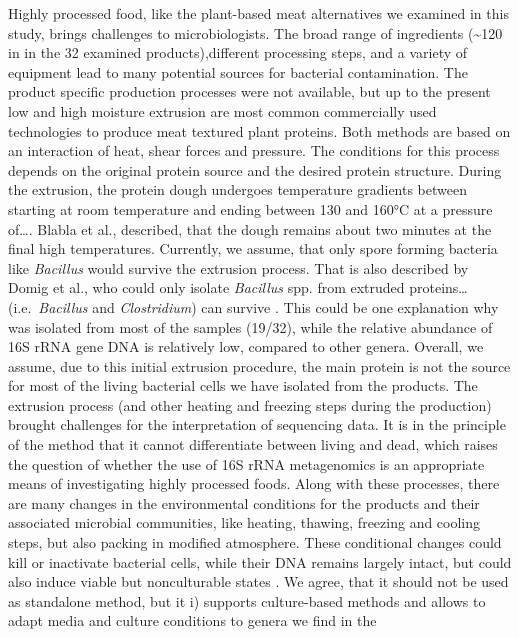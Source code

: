 \documentclass[preprint, 3p,
authoryear]{elsarticle} %
\begin{document}
Highly processed food, like the plant-based meat alternatives we
examined in this study, brings challenges to microbiologists. The broad
range of ingredients (\textasciitilde120 in in the 32 examined
products),different processing steps, and a variety of equipment lead to
many potential sources for bacterial contamination. The product specific
production processes were not available, but up to the present low and
high moisture extrusion are most common commercially used technologies
to produce meat textured plant proteins. Both methods are based on an
interaction of heat, shear forces and pressure. The conditions for this
process depends on the original protein source and the desired protein
structure. During the extrusion, the protein dough undergoes temperature
gradients between starting at room temperature and ending between 130
and 160°C at a pressure of\ldots. Blabla et al., described, that the
dough remains about two minutes at the final high temperatures.
Currently, we assume, that only spore forming bacteria like
\emph{Bacillus} would survive the extrusion process. That is also
described by Domig et al., who could only isolate \emph{Bacillus} spp.
from extruded proteins\ldots(i.e.~\emph{Bacillus} and
\emph{Clostridium}) can survive \citep{Leutgeb.2017}. This could be one
explanation why was isolated from most of the samples (19/32), while the
relative abundance of 16S rRNA gene DNA is relatively low, compared to
other genera. Overall, we assume, due to this initial extrusion
procedure, the main protein is not the source for most of the living
bacterial cells we have isolated from the products. The extrusion
process (and other heating and freezing steps during the production)
brought challenges for the interpretation of sequencing data. It is in
the principle of the method that it cannot differentiate between living
and dead, which raises the question of whether the use of 16S rRNA
metagenomics is an appropriate means of investigating highly processed
foods. Along with these processes, there are many changes in the
environmental conditions for the products and their associated microbial
communities, like heating, thawing, freezing and cooling steps, but also
packing in modified atmosphere. These conditional changes could kill or
inactivate bacterial cells, while their DNA remains largely intact, but
could also induce viable but nonculturable states
\citep{Li.2014, Zhao.2017}. We agree, that it should not be used as
standalone method, but it i) supports culture-based methods and allows
to adapt media and culture conditions to genera we find in the
\end{document}
